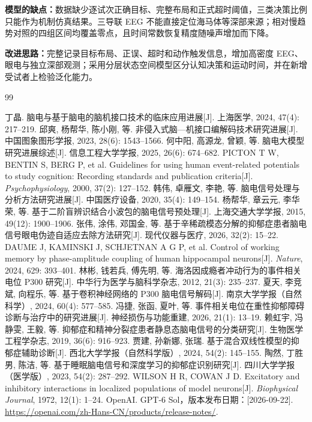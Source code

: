 \documentclass[a4paper,zihao=-4,linespread=1]{ctexart}
\numberwithin{figure}{section}       %
\begin{document}
\textbf{模型的缺点：}数据缺少逐试次正确目标、完整布局和正式超时阈值，三类决策比例只能作为机制仿真结果。三导联 EEG 不能直接定位海马体等深部来源；相对慢趋势对照的四组区间均覆盖零点，且时间常数恢复精度随噪声增加而下降。

\textbf{改进思路：}完整记录目标布局、正误、超时和动作触发信息，增加高密度 EEG、眼电与独立深部观测；采用分层状态空间模型区分认知决策和运动时间，并在新增受试者上检验泛化能力。


\clearpage
\begin{thebibliography}{99}
丁晶. 脑电与基于脑电的脑机接口技术的临床应用进展[J]. 上海医学, 2024, 47(4): 217--219.
邱爽, 杨帮华, 陈小刚, 等. 非侵入式脑—机接口编解码技术研究进展[J]. 中国图象图形学报, 2023, 28(6): 1543--1566.
何中阳, 高源龙, 曾颖, 等. 脑电大模型研究进展综述[J]. 信息工程大学学报, 2025, 26(6): 674--682.
PICTON T W, BENTIN S, BERG P, et al. Guidelines for using human event-related potentials to study cognition: Recording standards and publication criteria[J]. \emph{Psychophysiology}, 2000, 37(2): 127--152.
韩伟, 卓雁文, 李艳, 等. 脑电信号处理与分析方法研究进展[J]. 中国医疗设备, 2020, 35(4): 149--154.
杨帮华, 章云元, 李华荣, 等. 基于二阶盲辨识结合小波包的脑电信号预处理[J]. 上海交通大学学报, 2015, 49(12): 1900--1906.
张伟, 涂伟, 邓国金, 等. 基于辛稀疏模态分解的抑郁症患者脑电信号眼电伪迹自适应去除方法研究[J]. 现代仪器与医疗, 2026, 32(2): 15--22.
DAUME J, KAMINSKI J, SCHJETNAN A G P, et al. Control of working memory by phase-amplitude coupling of human hippocampal neurons[J]. \emph{Nature}, 2024, 629: 393--401.
林彬, 钱若兵, 傅先明, 等. 海洛因成瘾者冲动行为的事件相关电位 P300 研究[J]. 中华行为医学与脑科学杂志, 2012, 21(3): 235--237.
夏天, 李竞斌, 向程乐, 等. 基于卷积神经网络的 P300 脑电信号解码[J]. 南京大学学报（自然科学）, 2024, 60(4): 577--585.
冯捷, 张函, 夏叶, 等. 事件相关电位在重性抑郁障碍诊断与治疗中的研究进展[J]. 神经损伤与功能重建, 2026, 21(1): 13--19.
赖虹宇, 冯静雯, 王毅, 等. 抑郁症和精神分裂症患者静息态脑电信号的分类研究[J]. 生物医学工程学杂志, 2019, 36(6): 916--923.
贾建, 孙新娜, 张瑞. 基于混合双线性模型的抑郁症辅助诊断[J]. 西北大学学报（自然科学版）, 2024, 54(2): 145--155.
陶然, 丁胜男, 陈洁, 等. 基于睡眠脑电信号和深度学习的抑郁症识别研究[J]. 四川大学学报（医学版）, 2023, 54(2): 287--292.
WILSON H R, COWAN J D. Excitatory and inhibitory interactions in localized populations of model neurons[J]. \emph{Biophysical Journal}, 1972, 12(1): 1--24.
OpenAI. GPT-6 Sol，版本发布日期：[2026-09-22].
\url{https://openai.com/zh-Hans-CN/products/release-notes/}.
\end{thebibliography}
\end{document}
